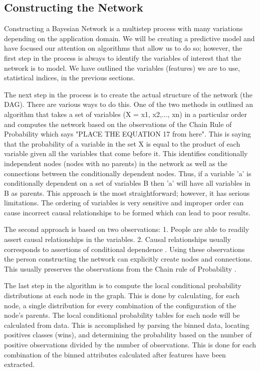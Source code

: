 \documentclass{acm_proc_article-sp}
\begin{document}
\subsection{Constructing the Network}
Constructing a Bayesian Network is a multistep process with many variations depending on the 
application domain. We will be creating a predictive model and have focused our attention on 
algorithms that allow us to do so; however, the first step in the process is always to identify the 
variables of interest that the network is to model. We have outlined the variables (features) we are 
to use, statistical indices, in the previous sections.

The next step in the process is to create the actual structure of the network (the DAG). There are 
various ways to do this. One of the two methods in \cite{heckerman} outlined an algorithm that takes 
a set of variables (X = {x1, x2,..., xn}) in a particular order and computes the network based on 
the observations of the Chain Rule of Probability which says "PLACE THE EQUATION 17 from \cite
{heckerman} here". This is saying that the probability of a variable in the set X is equal to the 
product of each variable given all the variables that come before it. This identifies conditionally 
independent nodes (nodes with no parents) in the network as well as the connections between the 
conditionally dependent nodes. Thus, if a variable 'a' is conditionally dependent on a set of 
variables B then 'a' will have all variables in B as parents. This approach is the most 
straightforward; however, it has serious limitations. The ordering of variables is very sensitive 
and improper order can cause incorrect causal relationships to be formed which can lead to poor 
results.

The second approach is based on two observations: 1. People are able to readily assert causal 
relationships in the variables. 2. Causal relationships usually corresponds to assertions of 
conditional dependence \cite{heckerman}. Using these observations the person constructing the 
network can explicitly create nodes and connections. This usually preserves the observations from 
the Chain rule of Probability \cite{heckerman}.

The last step in the algorithm is to compute the local conditional probability distributions at each 
node in the graph. This is done by calculating, for each node, a single distribution for every 
combination of the configuration of the node's parents. The local conditional probability tables for 
each node will be calculated from data. This is accomplished by parsing the binned data, locating 
positives classes (wins), and determining the probability based on the number of positive 
observations divided by the number of observations. This is done for each combination of the binned 
attributes calculated after features have been extracted.
\end{document}
